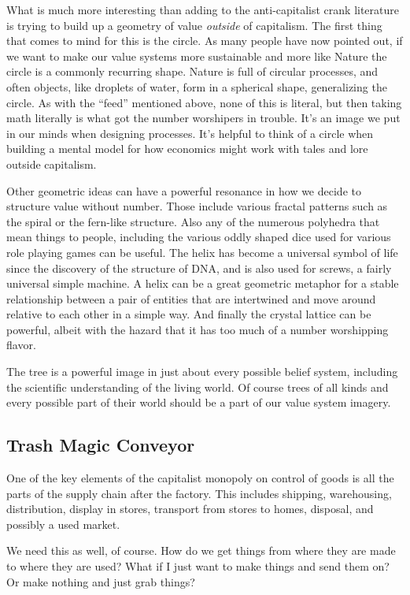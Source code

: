 What is much more interesting than adding to the anti-capitalist crank
literature is trying to build up a geometry of value \emph{outside} of
capitalism. The first thing that comes to mind for this is the circle.
As many people have now pointed out, if we want to make our value
systems more sustainable and more like Nature the circle is a commonly
recurring shape. Nature is full of circular processes, and often
objects, like droplets of water, form in a spherical shape, generalizing
the circle. As with the ``feed'' mentioned above, none of this is
literal, but then taking math literally is what got the number
worshipers in trouble. It's an image we put in our minds when designing
processes. It's helpful to think of a circle when building a mental
model for how economics might work with tales and lore outside
capitalism.

Other geometric ideas can have a powerful resonance in how we decide to
structure value without number. Those include various fractal patterns
such as the spiral or the fern-like structure. Also any of the numerous
polyhedra that mean things to people, including the various oddly shaped
dice used for various role playing games can be useful. The helix has
become a universal symbol of life since the discovery of the structure
of DNA, and is also used for screws, a fairly universal simple machine.
A helix can be a great geometric metaphor for a stable relationship
between a pair of entities that are intertwined and move around relative
to each other in a simple way. And finally the crystal lattice can be
powerful, albeit with the hazard that it has too much of a number
worshipping flavor.

The tree is a powerful image in just about every possible belief system,
including the scientific understanding of the living world. Of course
trees of all kinds and every possible part of their world should be a
part of our value system imagery.

\subsection{Trash Magic Conveyor}\label{trash-magic-conveyor}

One of the key elements of the capitalist monopoly on control of goods
is all the parts of the supply chain after the factory. This includes
shipping, warehousing, distribution, display in stores, transport from
stores to homes, disposal, and possibly a used market.

We need this as well, of course. How do we get things from where they
are made to where they are used? What if I just want to make things and
send them on? Or make nothing and just grab things?

